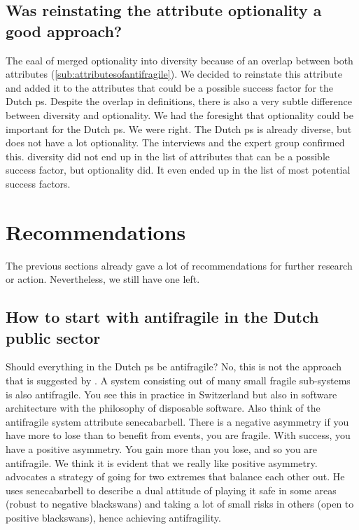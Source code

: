 \subsection{Was reinstating the attribute optionality a good approach?}
\label{sub:reinstating optionality}
The \acrlong{eaal} of \textcite{Botjes2021} merged \gls{optionality} into \gls{diversity} because of an overlap between both \glspl{attribute} (\cref{sub:attributesofantifragile}). We decided to reinstate this attribute and added it to the attributes that could be a possible success factor for the Dutch \gls{ps}. Despite the overlap in definitions, there is also a very subtle difference between \gls{diversity} and \gls{optionality}. We had the foresight that \gls{optionality} could be important for the Dutch \gls{ps}. We were right. The Dutch \gls{ps} is already diverse, but does not have a lot optionality. The interviews and the expert group confirmed this. \Gls{diversity} did not end up in the list of \glspl{attribute} that can be a possible success factor, but \gls{optionality} did. It even ended up in the list of most potential success factors.

\section{Recommendations}
\label{sec:reccomandations}
The previous sections already gave a lot of recommendations for further research or action. Nevertheless, we still have one left.

\subsection{How to start with antifragile in the Dutch public sector}
\label{sub:howtostart}
Should everything in the Dutch \gls{ps} be \gls{antifragile}? No, this is not the approach that is suggested by \textcite{Taleb2012}. A system consisting out of many small \gls{fragile} sub-systems is also \gls{antifragile}. You see this in practice in Switzerland but also in software architecture with the philosophy of disposable software. Also think of the \gls{antifragile} system \gls{attribute} \gls{senecabarbell}. There is a negative asymmetry if you have more to lose than to benefit from events, you are fragile. With success, you have a positive asymmetry. You gain more than you lose, and so you are \gls{antifragile}. We think it is evident that we really like positive asymmetry. \textcite{Taleb2012} advocates a strategy of going for two extremes that balance each other out. He uses \gls{senecabarbell} to describe a dual attitude of playing it safe in some areas (robust to negative \glspl{blackswan}) and taking a lot of small risks in others (open to positive \glspl{blackswan}), hence achieving \gls{antifragility}.


